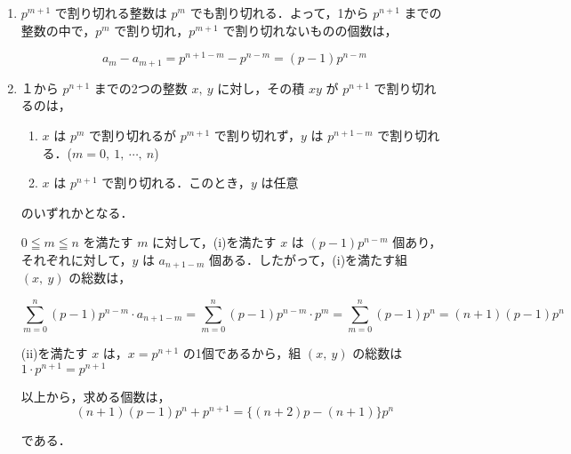 \documentclass[a4paper]{ltjsarticle}
\begin{document}
\begin{enumerate}[label=(\arabic*)]
    \item $p^{m+1}$ で割り切れる整数は $p^m$ でも割り切れる．よって，1から $p^{n+1}$ までの整数の中で，$p^m$ で割り切れ，$p^{m+1}$ で割り切れないものの個数は，

          \begin{equation*}
              a_m-a_{m+1}=p^{n+1-m}-p^{n-m}=(p-1)p^{n-m}
          \end{equation*}

    \item １から $p^{n+1}$ までの2つの整数 $x,\ y$ に対し，その積 $xy$ が $p^{n+1}$ で割り切れるのは，

          \begin{enumerate}[label=(\roman*)]
              \item $x$ は $p^{m}$ で割り切れるが $p^{m+1}$ で割り切れず，$y$ は $p^{n+1-m}$ で割り切れる．($m=0,\ 1,\ \cdots,\ n$)

              \item $x$ は $p^{n+1}$ で割り切れる．このとき，$y$ は任意
          \end{enumerate}

          のいずれかとなる．

          $0\leqq m\leqq n$ を満たす $m$ に対して，(i)を満たす $x$ は $(p-1)p^{n-m}$ 個あり，それぞれに対して，$y$ は $a_{n+1-m}$ 個ある．したがって，(i)を満たす組 $(x,\ y)$ の総数は，

          \begin{equation*}
              \sum_{m=0}^{n}(p-1)p^{n-m}\cdot a_{n+1-m}=\sum_{m=0}^{n}(p-1)p^{n-m}\cdot p^m=\sum_{m=0}^{n}(p-1)p^n=(n+1)(p-1)p^n
          \end{equation*}

          (ii)を満たす $x$ は，$x=p^{n+1}$ の1個であるから，組 $(x,\ y)$ の総数は $1\cdot p^{n+1}=p^{n+1}$

          以上から，求める個数は，
          \begin{equation*}
              (n+1)(p-1)p^n+p^{n+1}=\Big\{(n+2)p-(n+1)\Big\}p^n
          \end{equation*}

          である．
\end{enumerate}

\end{document}
